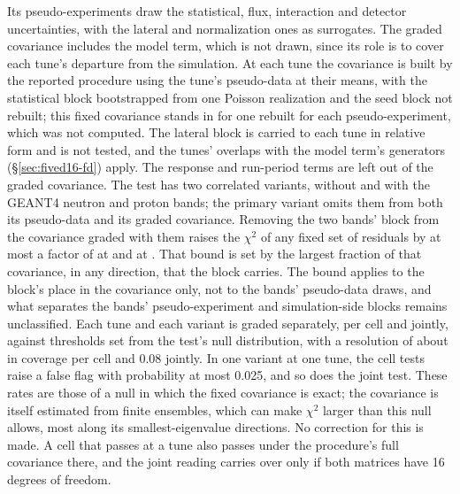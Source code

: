 Its pseudo-experiments draw the statistical, flux, interaction and detector uncertainties, with the lateral and normalization ones as surrogates. The graded covariance includes the model term, which is not drawn, since its role is to cover each tune's departure from the simulation. At each tune the covariance is built by the reported procedure using the tune's pseudo-data at their means, with the statistical block bootstrapped from one Poisson realization and the seed block not rebuilt; this fixed covariance stands in for one rebuilt for each pseudo-experiment, which was not computed. The lateral block is carried to each tune in relative form and is not tested, and the tunes' overlaps with the model term's generators (\S\ref{sec:fived16-fd}) apply. The response and run-period terms are left out of the graded covariance. The test has two correlated variants, without and with the GEANT4 neutron and proton bands; the primary variant omits them from both its pseudo-data and its graded covariance. Removing the two bands' block from the covariance graded with them raises the $\chi^2$ of any fixed set of residuals by at most a factor of  at  and  at . That bound is set by the largest fraction of that covariance, in any direction, that the block carries. The bound applies to the block's place in the covariance only, not to the bands' pseudo-data draws, and what separates the bands' pseudo-experiment and simulation-side blocks remains unclassified. Each tune and each variant is graded separately, per cell and jointly, against thresholds set from the test's null distribution, with a resolution of about  in coverage per cell and 0.08 jointly. In one variant at one tune, the cell tests raise a false flag with probability at most 0.025, and so does the joint test. These rates are those of a null in which the fixed covariance is exact; the covariance is itself estimated from finite ensembles, which can make $\chi^2$ larger than this null allows, most along its smallest-eigenvalue directions. No correction for this is made. A cell that passes at a tune also passes under the procedure's full covariance there, and the joint reading carries over only if both matrices have 16 degrees of freedom.

